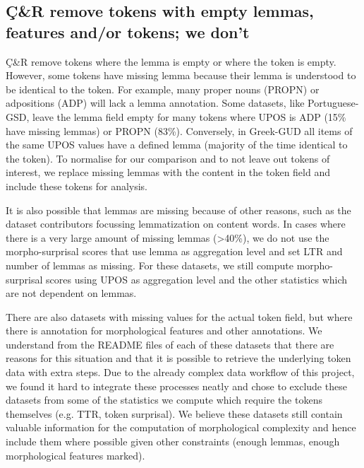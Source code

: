 \documentclass[USenglish]{article}
\begin{document}
\subsection{Ç\&R remove tokens with empty lemmas, features and/or tokens; we don't}\label{appedix:differences_remove_empty_lemmas_tokens}

Ç\&R remove tokens where the lemma is empty or where the token is empty.
However, some tokens have missing lemma because their lemma is understood to be identical to the token.
For example, many proper nouns (PROPN) or adpositions (ADP) will lack a lemma annotation. Some datasets, like Portuguese-GSD, leave the lemma field empty for many tokens where UPOS is ADP (15\% have missing lemmas) or PROPN (83\%). Conversely, in Greek-GUD all items of the same UPOS values have a defined lemma (majority of the time identical to the token). To normalise for our comparison and to not leave out tokens of interest, we replace missing lemmas with the content in the token field and include these tokens for analysis.

It is also possible that lemmas are missing because of other reasons, such as the dataset contributors focussing lemmatization on content words. 
In cases where there is a very large amount of missing lemmas (>40\%), we do not use the morpho-surprisal scores that use lemma as aggregation level and set LTR and number of lemmas as missing. 
For these datasets, we still compute morpho-surprisal scores using UPOS as aggregation level and the other statistics which are not dependent on lemmas.

There are also datasets with missing values for the actual token field, but where there is annotation for morphological features and other annotations. 
We understand from the README files of each of these datasets that there are reasons for this situation and that it is possible to retrieve the underlying token data with extra steps.
Due to the already complex data workflow of this project, we found it hard to integrate these processes neatly and chose to exclude these datasets from some of the statistics we compute which require the tokens themselves (e.g. TTR, token surprisal). 
We believe these datasets still contain valuable information for the computation of morphological complexity and hence include them where possible given other constraints (enough lemmas, enough morphological features marked).
\end{document}
